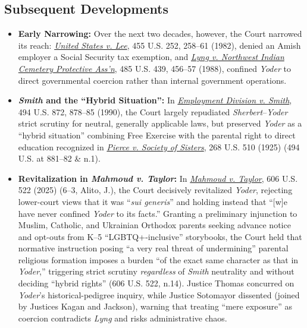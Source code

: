 \documentclass[12pt]{article}
\begin{document}
\subsection{Subsequent Developments}

\begin{itemize}

\item \textbf{Early Narrowing:} Over the next two decades, however, the Court narrowed its reach: \href{https://supreme.justia.com/cases/federal/us/455/252/}{\emph{United States v. Lee}}, 455 U.S. 252, 258--61 (1982), denied an Amish employer a Social Security tax exemption, and \href{https://supreme.justia.com/cases/federal/us/485/439/}{\emph{Lyng v. Northwest Indian Cemetery Protective Ass'n}}, 485 U.S. 439, 456--57 (1988), confined \emph{Yoder} to direct governmental coercion rather than internal government operations.

\item \textbf{\emph{Smith} and the ``Hybrid Situation'':} In \href{https://supreme.justia.com/cases/federal/us/494/872/}{\emph{Employment Division v. Smith}}, 494 U.S. 872, 878--85 (1990), the Court largely repudiated \emph{Sherbert}--\emph{Yoder} strict scrutiny for neutral, generally applicable laws, but preserved \emph{Yoder} as a ``hybrid situation'' combining Free Exercise with the parental right to direct education recognized in \href{https://supreme.justia.com/cases/federal/us/268/510/}{\emph{Pierce v. Society of Sisters}}, 268 U.S. 510 (1925) (494 U.S. at 881--82 \& n.1).

\item \textbf{Revitalization in \emph{Mahmoud v. Taylor}:} In \href{https://www.law.cornell.edu/supremecourt/text/24-297}{\emph{Mahmoud v. Taylor}}, 606 U.S. 522 (2025) (6--3, Alito, J.), the Court decisively revitalized \emph{Yoder}, rejecting lower-court views that it was ``\emph{sui generis}'' and holding instead that ``[w]e have never confined \emph{Yoder} to its facts.'' Granting a preliminary injunction to Muslim, Catholic, and Ukrainian Orthodox parents seeking advance notice and opt-outs from K--5 ``LGBTQ+-inclusive'' storybooks, the Court held that normative instruction posing ``a very real threat of undermining'' parental religious formation imposes a burden ``of the exact same character as that in \emph{Yoder},'' triggering strict scrutiny \emph{regardless} of \emph{Smith} neutrality and without deciding ``hybrid rights'' (606 U.S. 522, n.14). Justice Thomas concurred on \emph{Yoder}'s historical-pedigree inquiry, while Justice Sotomayor dissented (joined by Justices Kagan and Jackson), warning that treating ``mere exposure'' as coercion contradicts \emph{Lyng} and risks administrative chaos.

\end{itemize}
\end{document}
